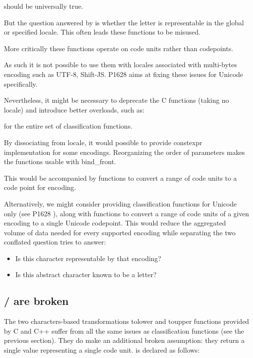 \documentclass{wg21}
\newcommand{\UnicodeLetter}[1]{\textbf{\textcolor{BrickRed}{\Large\tcode{#1}}}}
\begin{document}
 should be universally true.

But the question answered by  is whether the letter \UnicodeLetter{a} is representable in the global or specified locale.
This often leads these functions to be misused.

More critically these functions operate on code units rather than codepoints.

As such it is not possible to use them with locales associated with multi-bytes encoding such as UTF-8, Shift-JS.
P1628 aims at fixing these issues for Unicode specifically.

Nevertheless, it might be necessary to deprecate the C functions (taking no locale) and introduce better overloads, such as:


for the entire set of classification functions.

By dissociating from locale, it would possible to provide constexpr implementation for some encodings.
Reorganizing the order of parameters makes the functions usable with bind_front.

This would be accompanied by functions to convert a range of code units to a code point for encoding.

Alternatively, we might consider providing classification functions for Unicode only (see P1628 \cite{P1628R0}), along with functions to convert a range of code units of a given encoding to a single Unicode codepoint. This would reduce the aggregated volume of data needed for every supported encoding while separating the two conflated question  tries to answer:

\begin{itemize}
\item Is this character representable by that encoding?
\item Is this abstract character known to be a letter?
\end{itemize}

\subsection{/ are broken}

The two characters-based transformations tolower and toupper functions provided by C and C++ suffer from all the same issues as classification functions (see the previous section).
They do make an additional broken assumption:
they return a single value representing a single code unit.  is declared as follows:
\end{document}
